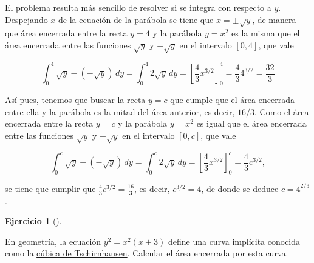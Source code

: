 \documentclass[
  spanish,
  a4paper,
]{scrreport}
\theoremstyle{definition}
\newtheorem{exercise}{Ejercicio}[chapter]
\theoremstyle{remark}
\begin{document}
\begin{tcolorbox}[enhanced jigsaw, arc=.35mm, bottomrule=.15mm, bottomtitle=1mm, breakable, colback=white, colbacktitle=quarto-callout-tip-color!10!white, colframe=quarto-callout-tip-color-frame, coltitle=black, left=2mm, leftrule=.75mm, opacityback=0, opacitybacktitle=0.6, rightrule=.15mm, title=\textcolor{quarto-callout-tip-color}{\faLightbulb}\hspace{0.5em}{Solución}, titlerule=0mm, toprule=.15mm, toptitle=1mm]

El problema resulta más sencillo de resolver si se integra con respecto
a \(y\). Despejando \(x\) de la ecuación de la parábola se tiene que
\(x=\pm\sqrt{y}\), de manera que área encerrada entre la recta \(y=4\) y
la parábola \(y=x^2\) es la misma que el área encerrada entre las
funciones \(\sqrt{y}\) y \(-\sqrt{y}\) en el intervalo \([0,4]\), que
vale

\[
\int_0^4 \sqrt{y}-(-\sqrt{y})\,dy
= \int_0^4 2\sqrt{y}\,dy 
= \left[\frac{4}{3}x^{3/2}\right]_0^4
= \frac{4}{3}4^{3/2} = \frac{32}{3}
\]

Así pues, tenemos que buscar la recta \(y=c\) que cumple que el área
encerrada entre ella y la parábola es la mitad del área anterior, es
decir, \(16/3\). Como el área encerrada entre la recta \(y=c\) y la
parábola \(y=x^2\) es igual que el área encerrada entre las funciones
\(\sqrt{y}\) y \(-\sqrt{y}\) en el intervalo \([0,c]\), que vale

\[
\int_0^c \sqrt{y}-(-\sqrt{y})\,dy
= \int_0^c 2\sqrt{y}\,dy 
= \left[\frac{4}{3}x^{3/2}\right]_0^c
= \frac{4}{3}c^{3/2},
\]

se tiene que cumplir que \(\frac{4}{3}c^{3/2}=\frac{16}{3}\), es decir,
\(c^{3/2} = 4\), de donde se deduce \(c = 4^{2/3}\).

\end{tcolorbox}

\begin{exercise}[]\protect\hypertarget{exr-tschirnhausen}{}\label{exr-tschirnhausen}

En geometría, la ecuación \(y^2=x^2(x+3)\) define una curva implícita
conocida como la
\href{https://es.wikipedia.org/wiki/C\%C3\%BAbica_de_Tschirnhausen}{cúbica
de Tschirnhausen}. Calcular el área encerrada por esta curva.

\end{exercise}
\end{document}
